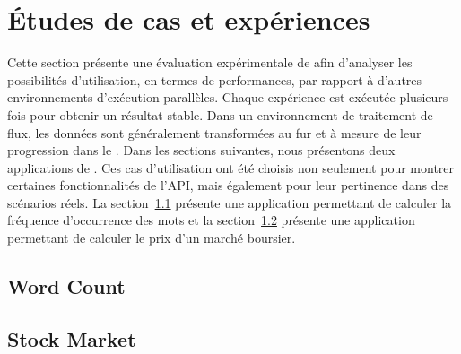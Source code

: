 
\chapter{\'Etudes de cas et exp\'eriences}
\label{experiences.chap}

Cette section pr\'esente une \'evaluation exp\'erimentale de  afin d'analyser les possibilit\'es d'utilisation, en termes de performances, par rapport \`a d'autres environnements d'ex\'ecution parall\`eles. Chaque exp\'erience est ex\'ecut\'ee plusieurs fois pour obtenir un r\'esultat stable. Dans un environnement de traitement de flux, les donn\'ees sont g\'en\'eralement transform\'ees au fur et \`a mesure de leur progression dans le . Dans les sections suivantes, nous pr\'esentons deux applications de . Ces cas d'utilisation ont \'et\'e choisis non seulement pour montrer certaines fonctionnalit\'es de l'API, mais \'egalement pour leur pertinence dans des sc\'enarios r\'eels. La section~\ref{wordcount.sect} pr\'esente une application permettant de calculer la fr\'equence d'occurrence des mots et la section~\ref{stockprice.sect} pr\'esente une application permettant de calculer le prix d'un marché boursier.


\section{Word Count}
\label{wordcount.sect}


\section{Stock Market}
\label{stockprice.sect}
